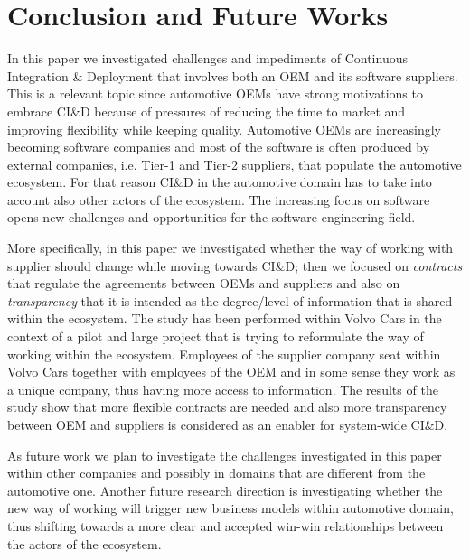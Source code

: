 \section{Conclusion and Future Works}\label{sec:conclusion}

In this paper we investigated challenges and impediments of Continuous Integration \& Deployment that involves both an OEM and its software suppliers.
This is a relevant topic since automotive OEMs have strong motivations to embrace CI\&D because of pressures of reducing the time to market and improving flexibility while keeping quality. Automotive OEMs are increasingly becoming software companies and most of the software is often produced by external companies, i.e. Tier-1 and Tier-2 suppliers, that populate the automotive ecosystem. 
For that reason CI\&D in the automotive domain has to take into account also other actors of the ecosystem.  The increasing focus on software opens new challenges and opportunities for the software engineering field. 

More specifically, in this paper we investigated whether the way of working with supplier should change while moving towards CI\&D; then we focused on {\em contracts} that regulate the agreements between OEMs and suppliers and also  
on {\em transparency} that it is intended as the degree/level of information that is shared within the ecosystem. 
The study has been performed within Volvo Cars in the context of a pilot and large project that is trying to reformulate the way of working within the ecosystem. Employees of the supplier company seat within Volvo Cars together with employees of the OEM and in some sense they work as a unique company, thus having more access to information. 
The results of the study show that more flexible contracts are needed and also more transparency between OEM and suppliers is considered as an enabler for system-wide CI\&D. 

As future work we plan to investigate the challenges investigated in this paper within other companies and possibly in domains that are different from the automotive one. Another future research direction is  investigating whether the new way of working will trigger new business models within automotive domain, thus shifting towards a more clear and accepted win-win relationships between the actors of the ecosystem.